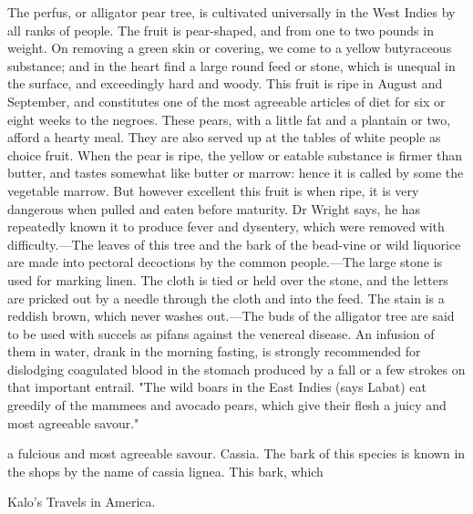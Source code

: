 \documentclass{article}
\begin{document}
The perfus, or alligator pear tree, is cultivated universally in the West Indies by all ranks of people. The fruit is pear-shaped, and from one to two pounds in weight. On removing a green skin or covering, we come to a yellow butyraceous substance; and in the heart find a large round feed or stone, which is unequal in the surface, and exceedingly hard and woody. This fruit is ripe in August and September, and constitutes one of the most agreeable articles of diet for six or eight weeks to the negroes. These pears, with a little fat and a plantain or two, afford a hearty meal. They are also served up at the tables of white people as choice fruit. When the pear is ripe, the yellow or eatable substance is firmer than butter, and tastes somewhat like butter or marrow: hence it is called by some the vegetable marrow. But however excellent this fruit is when ripe, it is very dangerous when pulled and eaten before maturity. Dr Wright says, he has repeatedly known it to produce fever and dysentery, which were removed with difficulty.—The leaves of this tree and the bark of the bead-vine or wild liquorice are made into pectoral decoctions by the common people.—The large stone is used for marking linen. The cloth is tied or held over the stone, and the letters are pricked out by a needle through the cloth and into the feed. The stain is a reddish brown, which never washes out.—The buds of the alligator tree are said to be used with succels as pifans against the venereal disease. An infusion of them in water, drank in the morning fasting, is strongly recommended for dislodging coagulated blood in the stomach produced by a fall or a few strokes on that important entrail. "The wild boars in the East Indies (says Labat) eat greedily of the mammees and avocado pears, which give their flesh a juicy and most agreeable savour."

a fulcious and most agreeable savour.
Cassia. The bark of this species is known in the
shops by the name of cassia lignea. This bark, which

Kalo's Travels in America.
\end{document}
